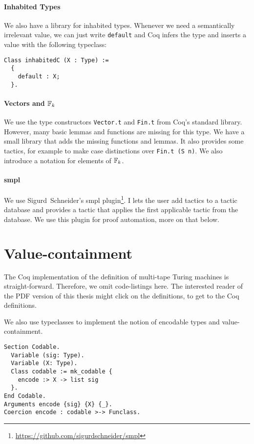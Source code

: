 \paragraph{Inhabited Types}
We also have a library for inhabited types.  Whenever we need a semantically irrelevant value, we can just write \lstinline!default! and Coq infers
the type and inserts a value with the following typeclass:
\begin{lstlisting}
Class inhabitedC (X : Type) :=
  {
    default : X;
  }.
\end{lstlisting}

\paragraph{Vectors and $\mathbb{F}_k$}

We use the type constructors \lstinline!Vector.t! and \lstinline!Fin.t! from Coq's standard library.  However, many basic lemmas and functions are
missing for this type.  We have a small library that adds the missing functions and lemmas.  It also provides some tactics, for example to make case
distinctions over \lstinline!Fin.t (S n)!.  We also introduce a notation for elements of $\mathbb{F}_k$.

\paragraph{smpl}

We use Sigurd~Schneider's smpl plugin\footnote{\url{https://github.com/sigurdschneider/smpl}}.  I lets the user add tactics to a tactic database and
provides a tactic that applies the first applicable tactic from the database.  We use this plugin for proof automation, more on that below.


\section*{Value-containment}
\label{sec:coq-values}

The Coq implementation of the definition of multi-tape Turing machines is straight-forward.  Therefore, we omit code-listings here.  The interested
reader of the PDF version of this thesis might click on the definitions, to get to the Coq definitions.

We also use typeclasses to implement the notion of encodable types and value-containment.

\begin{lstlisting}
Section Codable.
  Variable (sig: Type).
  Variable (X: Type).
  Class codable := mk_codable {
    encode :> X -> list sig
  }.
End Codable.
Arguments encode {sig} {X} {_}.
Coercion encode : codable >-> Funclass.
\end{lstlisting}

